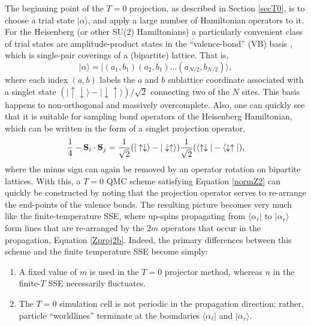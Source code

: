 \documentclass[vecphys]{svmult}
\begin{document}
The beginning point of the $T=0$ projection, as described in Section \ref{secT0}, is to choose a trial state $| \alpha \rangle$, and apply a large number of Hamiltonian operators to it.  
For the Heisenberg (or other SU(2) Hamiltonians) a particularly convenient class of trial states are amplitude-product states in the ``valence-bond'' (VB) basis \cite{Melko:Sandvik05,Melko:Beach06,Melko:AWSBeach}, which is single-pair coverings of a (bipartite) lattice.  That is, 
\begin{equation}
| \alpha \rangle = | (a_1,b_1)(a_2,b_1) \ldots (a_{N/2}, b_{N/2})  \rangle,
\end{equation}
where each index $(a,b)$ labels the $a$ and $b$ sublattice coordinate associated with a singlet state $(|\uparrow \downarrow \rangle  - | \downarrow \uparrow \rangle)/\sqrt{2}$ connecting two of the $N$ sites.  This basis happens to non-orthogonal and massively overcomplete.  Also, one can quickly see that it is suitable for sampling bond operators of the Heisenberg Hamiltonian, which can be written in the form of a singlet projection operator,
\begin{equation}
\frac{1}{4} - {\bf  S}_i \cdot {\bf S}_j = \frac{1}{\sqrt{2}} (|\uparrow \downarrow \rangle  - |\downarrow \uparrow \rangle)
 \frac{1}{\sqrt{2}}  (\langle \uparrow \downarrow |  - \langle \downarrow \uparrow |),
\end{equation}
where the minus sign can again be removed by an operator rotation on bipartite lattices.
With this, a $T=0$ QMC scheme satisfying Equation \ref{normZ2} can quickly be constructed by noting that the projection operator serves to re-arrange the end-points of the valence bonds.  The resulting picture becomes very much like the finite-temperature SSE, where up-spins propagating from $\langle \alpha_{\ell} |$ to $| \alpha_r \rangle$ form lines that are re-arranged by the $2m$ operators that occur in the propagation, Equation \ref{Zproj2b}.
Indeed, the primary differences between this scheme and the finite temperature SSE become simply:
\begin{enumerate}
\item A fixed value of $m$ is used in the $T=0$ projector method, whereas $n$ in the finite-$T$ SSE necessarily fluctuates.
\item The $T=0$ simulation cell is not periodic in the propagation direction; rather, particle ``worldlines'' terminate at the boundaries  $\langle \alpha_{\ell} |$ and $| \alpha_r \rangle$.
\end{enumerate}
\end{document}
